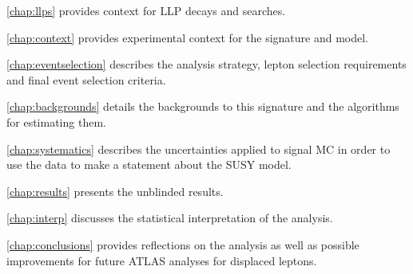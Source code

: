 \autoref{chap:llps} provides context for \ac{LLP} decays and searches.

\autoref{chap:context} provides experimental context for the signature and model.

\autoref{chap:eventselection} describes the analysis strategy, lepton selection requirements and final event selection criteria.

\autoref{chap:backgrounds} details the backgrounds to this signature and the algorithms for estimating them.

\autoref{chap:systematics} describes the uncertainties applied to signal \ac{MC} in order to use the data to make a statement about the \ac{SUSY} model.

\autoref{chap:results} presents the unblinded results.

\autoref{chap:interp} discusses the statistical interpretation of the analysis.  

\autoref{chap:conclusions} provides reflections on the analysis as well as possible improvements for future \ac{ATLAS} analyses for displaced leptons.


